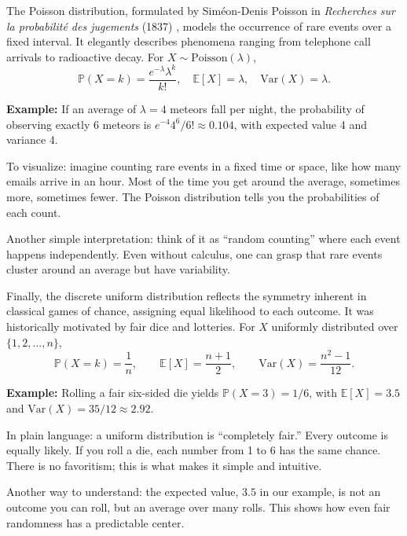 \documentclass{book}
\begin{document}
The Poisson distribution, formulated by Siméon-Denis Poisson in \emph{Recherches sur la probabilité des jugements} (1837) \cite{poisson-judgements}, models the occurrence of rare events over a fixed interval. It elegantly describes phenomena ranging from telephone call arrivals to radioactive decay. For $X \sim \text{Poisson}(\lambda)$,
\[
\mathbb{P}(X=k)=\frac{e^{-\lambda}\lambda^k}{k!}, \quad 
\mathbb{E}[X]=\lambda, \quad \mathrm{Var}(X)=\lambda.
\]

\textbf{Example:} If an average of $\lambda=4$ meteors fall per night, the probability of observing exactly 6 meteors is $e^{-4}4^6/6! \approx 0.104$, with expected value 4 and variance 4.

To visualize: imagine counting rare events in a fixed time or space, like how many emails arrive in an hour. Most of the time you get around the average, sometimes more, sometimes fewer. The Poisson distribution tells you the probabilities of each count.

Another simple interpretation: think of it as “random counting” where each event happens independently. Even without calculus, one can grasp that rare events cluster around an average but have variability.

Finally, the discrete uniform distribution reflects the symmetry inherent in classical games of chance, assigning equal likelihood to each outcome. It was historically motivated by fair dice and lotteries. For $X$ uniformly distributed over $\{1,2,\ldots,n\}$,
\[
\mathbb{P}(X=k)=\frac{1}{n}, \qquad
\mathbb{E}[X]=\frac{n+1}{2}, \qquad
\mathrm{Var}(X)=\frac{n^2-1}{12}.
\]

\textbf{Example:} Rolling a fair six-sided die yields $\mathbb{P}(X=3)=1/6$, with $\mathbb{E}[X]=3.5$ and $\mathrm{Var}(X)=35/12 \approx 2.92$.

In plain language: a uniform distribution is “completely fair.” Every outcome is equally likely. If you roll a die, each number from 1 to 6 has the same chance. There is no favoritism; this is what makes it simple and intuitive.

Another way to understand: the expected value, $3.5$ in our example, is not an outcome you can roll, but an average over many rolls. This shows how even fair randomness has a predictable center.
\end{document}
